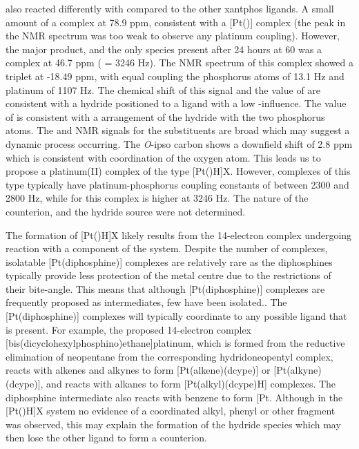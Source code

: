 \tBuXantphos{} also reacted differently with \ce{[Pt(nb)3]} compared to the other xantphos ligands.  A small amount of a complex at 78.9 ppm, consistent with a [Pt(\tBuxantphos)] complex (the peak in the \phosphorus{} NMR spectrum was too weak to observe any platinum coupling).  However, the major product, and the only species present after 24 hours at 60\degC{} was a complex at 46.7 ppm (\JPtP{} = 3246 Hz).  The \proton{} NMR spectrum of this complex showed a triplet at -18.49 ppm, with equal coupling the phosphorus atoms of 13.1 Hz and platinum of 1107 Hz.  The chemical shift of this signal and the value of \JPtH{} are consistent with a hydride positioned \trans{} to a ligand with a low \trans{}-influence.  The value of \JPH{} is consistent with a \cis{} arrangement of the hydride with the two phosphorus atoms.  The \proton{} and \carbon{} NMR signals for the \tBu{} substituents are broad which may suggest a dynamic process occurring.  The \emph{O}-ipso carbon shows a downfield shift of 2.8 ppm which is consistent with coordination of the oxygen atom.  This leads us to propose a platinum(II) complex of the type [Pt(\tBuxantphosk)H]X.  However, complexes of this type typically have platinum-phosphorus coupling constants of between 2300 and 2800 Hz, while \JPtP{} for this complex is higher at 3246 Hz.  The nature of the counterion, and the hydride source were not determined.  

The formation of [Pt(\tBuxantphosk)H]X likely results from the 14-electron complex undergoing reaction with a component of the system.  Despite the number of \ce{[Pt(monophosphine)2]} complexes, isolatable [Pt(diphosphine)] complexes are relatively rare as the diphosphines typically provide less protection of the metal centre due to the restrictions of their bite-angle.  This means that although [Pt(diphosphine)] complexes are frequently proposed as intermediates, few have been isolated.\cite{Clark1986b, Hackett1988, Nicolas2012}.  The [Pt(diphosphine)] complexes will typically coordinate to any possible ligand that is present.  For example, the proposed 14-electron complex [bis(dicyclohexylphosphino)ethane]platinum, which is formed from the reductive elimination of neopentane from the corresponding hydridoneopentyl complex, reacts with alkenes and alkynes to form [Pt(alkene)(dcype)] or [Pt(alkyne)(dcype)], and reacts with alkanes to form [Pt(alkyl)(dcype)H] complexes.  The diphosphine intermediate also reacts with benzene to form [Pt\ce{(C6H5)(dcype)H]}.  Although in the [Pt(\tBuxantphosk)H]X system no evidence of a coordinated alkyl, phenyl or other fragment was observed, this may explain the formation of the hydride species which may then lose the other ligand to form a counterion.  

